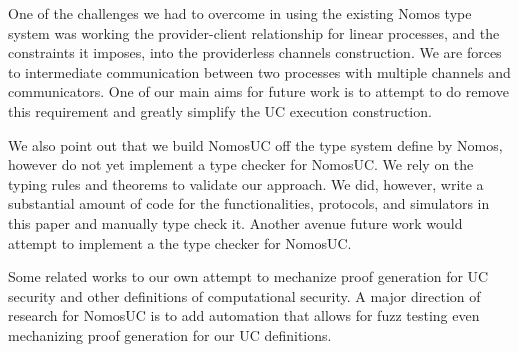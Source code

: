 One of the challenges we had to overcome in using the existing Nomos type system was working the provider-client relationship for linear processes, and the constraints it imposes, into the providerless channels construction.
We are forces to intermediate communication between two processes with multiple channels and communicators. 
One of our main aims for future work is to attempt to do remove this requirement and greatly simplify the UC execution construction.

We also point out that we build NomosUC off the type system define by Nomos, however do not yet implement a type checker for NomosUC. We rely on the typing rules and theorems to validate our approach.
We did, however, write a substantial amount of code for the functionalities, protocols, and simulators in this paper and manually type check it.
Another avenue future work would attempt to implement a the type checker for NomosUC.

Some related works to our own attempt to mechanize proof generation for UC security and other definitions of computational security.
A major direction of research for NomosUC is to add automation that allows for fuzz testing even mechanizing proof generation for our UC definitions.
